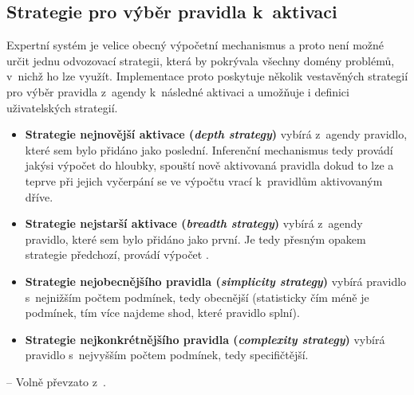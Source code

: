 \subsection{Strategie pro výběr pravidla k~aktivaci}
Expertní systém je velice obecný výpočetní mechanismus a proto není možné
určit jednu odvozovací strategii, která by pokrývala všechny domény problémů,
v~nichž ho lze využít. Implementace proto poskytuje několik vestavěných
strategií pro výběr pravidla z~agendy k~následné aktivaci a umožňuje i
definici uživatelských strategií.
\begin{itemize}
\item {\bf{}Strategie nejnovější aktivace (\emph{depth strategy})} vybírá z~agendy
pravidlo, které sem bylo přidáno jako poslední. Inferenční mechanismus tedy
provádí jakýsi výpočet do hloubky, spouští nově aktivovaná pravidla dokud to
lze a teprve při jejich vyčerpání se ve výpočtu vrací k~pravidlům aktivovaným
dříve.
\item {\bf{}Strategie nejstarší aktivace (\emph{breadth strategy})} vybírá z~agendy
pravidlo, které sem bylo přidáno jako první. Je tedy přesným opakem strategie
předchozí, provádí výpočet .
\item {\bf{}Strategie nejobecnějšího pravidla (\emph{simplicity strategy})} vybírá
pravidlo s~nejnižším počtem podmínek, tedy obecnější (statisticky čím méně je podmínek,
tím více najdeme shod, které pravidlo splní).
\item {\bf{}Strategie nejkonkrétnějšího pravidla (\emph{complexity strategy})} vybírá
pravidlo s~nejvyšším počtem podmínek, tedy specifičtější.
\end{itemize}
-- Volně převzato z~\cite{introduction}.
